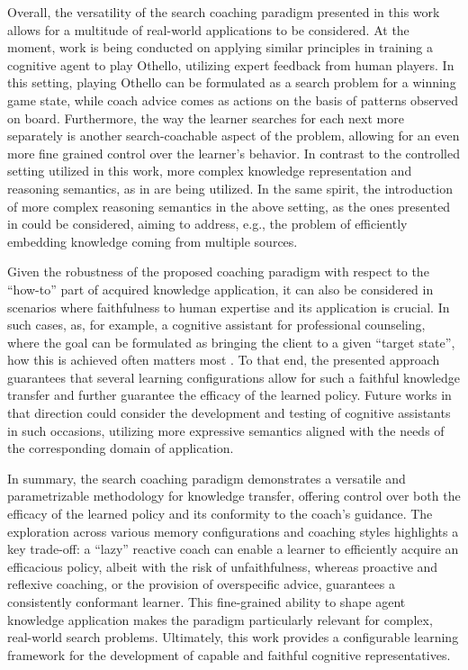 \documentclass[a4paper,twoside]{article}
\begin{document}
Overall, the versatility of the search coaching paradigm presented in this work allows for a multitude of real-world applications to be considered. At the moment, work is being conducted on applying similar principles in training a cognitive agent to play Othello, utilizing expert feedback from human players. In this setting, playing Othello can be formulated as a search problem for a winning game state, while coach advice comes as actions on the basis of patterns observed on board. Furthermore, the way the learner searches for each next more separately is another search-coachable aspect of the problem, allowing for an even more fine grained control over the learner's behavior. In contrast to the controlled setting utilized in this work, more complex knowledge representation and reasoning semantics, as in \cite{michaelMachineCoaching2019,prudens2022} are being utilized. In the same spirit, the introduction of more complex reasoning semantics in the above setting, as the ones presented in \cite{DUNG1995321} could be considered, aiming to address, e.g., the problem of efficiently embedding knowledge coming from multiple sources.

Given the robustness of the proposed coaching paradigm with respect to the ``how-to'' part of acquired knowledge application, it can also be considered in scenarios where faithfulness to human expertise and its application is crucial. In such cases, as, for example, a cognitive assistant for professional counseling, where the goal can be formulated as bringing the client to a given ``target state'', how this is achieved often matters most \cite{sedlakova2023}. To that end, the presented approach guarantees that several learning configurations allow for such a faithful knowledge transfer and further guarantee the efficacy of the learned policy. Future works in that direction could consider the development and testing of cognitive assistants in such occasions, utilizing more expressive semantics aligned with the needs of the corresponding domain of application.

In summary, the search coaching paradigm demonstrates a versatile and parametrizable methodology for knowledge transfer, offering control over both the efficacy of the learned policy and its conformity to the coach's guidance. The exploration across various memory configurations and coaching styles highlights a key trade-off: a ``lazy'' reactive coach can enable a learner to efficiently acquire an efficacious policy, albeit with the risk of unfaithfulness, whereas proactive and reflexive coaching, or the provision of overspecific advice, guarantees a consistently conformant learner. This fine-grained ability to shape agent knowledge application makes the paradigm particularly relevant for complex, real-world search problems. Ultimately, this work provides a configurable learning framework for the development of capable and faithful cognitive representatives.
%
%
%

{\small
}
\end{document}
